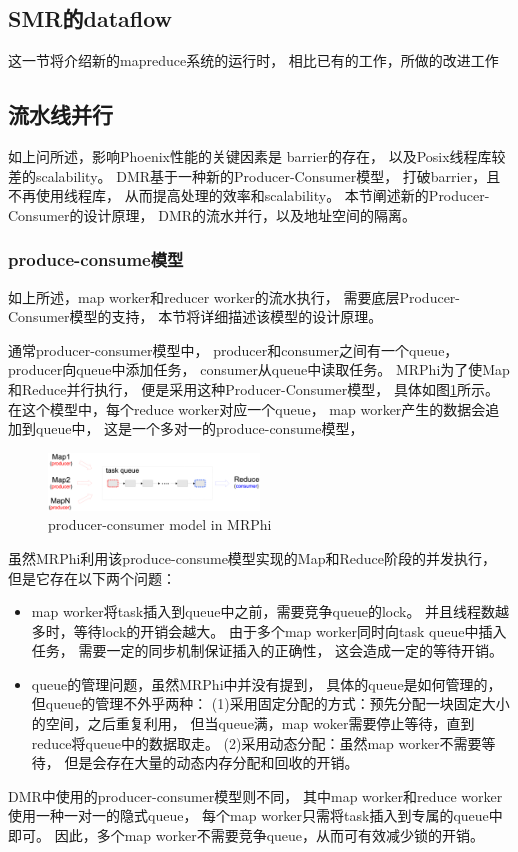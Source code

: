 
\subsection{SMR的dataflow}
这一节将介绍新的mapreduce系统\myds 的运行时，
相比已有的工作，\myds 所做的改进工作
\subsection{流水线并行}
如上问所述，影响Phoenix性能的关键因素是
barrier的存在，
以及Posix线程库较差的scalability。
DMR基于一种新的Producer-Consumer模型，
打破barrier，且不再使用线程库，
从而提高处理的效率和scalability。
本节阐述新的Producer-Consumer的设计原理，
DMR的流水并行，以及地址空间的隔离。


\subsubsection{produce-consume模型}
如上所述，map worker和reducer worker的流水执行，
需要底层Producer-Consumer模型的支持，
本节将详细描述该模型的设计原理。

通常producer-consumer模型中，
producer和consumer之间有一个queue，
producer向queue中添加任务，
consumer从queue中读取任务。
MRPhi\cite{lu2013mrphi}为了使Map和Reduce并行执行，
便是采用这种Producer-Consumer模型，
具体如图\ref{mrphi:pc-model}所示。
在这个模型中，每个reduce worker对应一个queue，
map worker产生的数据会追加到queue中，
这是一个多对一的produce-consume模型，
\begin{figure}[!h!t]  
    \centering
    \includegraphics[width=0.5\textwidth]{img/mrphi_pc_model.eps}
    \caption{producer-consumer model in MRPhi}
    \label{mrphi:pc-model}
\end{figure}
虽然MRPhi利用该produce-consume模型实现的Map和Reduce阶段的并发执行，
但是它存在以下两个问题：
\begin{itemize}  
  \item map worker将task插入到queue中之前，需要竞争queue的lock。
  并且线程数越多时，等待lock的开销会越大。
  由于多个map worker同时向task queue中插入任务，
  需要一定的同步机制保证插入的正确性，
  这会造成一定的等待开销。
  \item queue的管理问题，虽然MRPhi\cite{lu2013mrphi}中并没有提到，
  具体的queue是如何管理的，但queue的管理不外乎两种：
  (1)采用固定分配的方式：预先分配一块固定大小的空间，之后重复利用，
  但当queue满，map woker需要停止等待，直到reduce将queue中的数据取走。
  (2)采用动态分配：虽然map worker不需要等待，
  但是会存在大量的动态内存分配和回收的开销。
\end{itemize}
  DMR中使用的producer-consumer模型则不同，
  其中map worker和reduce worker使用一种一对一的隐式queue，
  每个map worker只需将task插入到专属的queue中即可。
  因此，多个map worker不需要竞争queue，从而可有效减少锁的开销。
  
